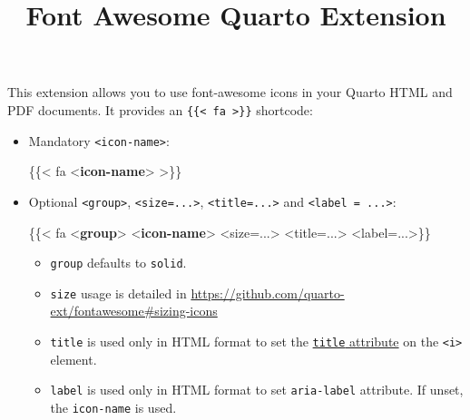 \documentclass[
  letterpaper,
  DIV=11,
  numbers=noendperiod]{scrartcl}
\title{Font Awesome Quarto Extension}
\author{}
\date{}
\newenvironment{Shaded}{\begin{snugshade}}{\end{snugshade}}
\newcommand{\DataTypeTok}[1]{\textcolor[rgb]{0.68,0.00,0.00}{#1}}
\newcommand{\KeywordTok}[1]{\textcolor[rgb]{0.00,0.23,0.31}{\textbf{#1}}}
\newcommand{\NormalTok}[1]{\textcolor[rgb]{0.00,0.23,0.31}{#1}}
\providecommand{\tightlist}{%
  \setlength{\itemsep}{0pt}\setlength{\parskip}{0pt}}
\begin{document}
\maketitle


This extension allows you to use font-awesome icons in your Quarto HTML
and PDF documents. It provides an
\texttt{\{\{\textless{}\ fa\ \textgreater{}\}\}} shortcode:

\begin{itemize}
\item
  Mandatory \texttt{\textless{}icon-name\textgreater{}}:

\begin{Shaded}
\begin{Highlighting}[]
\NormalTok{\{\{\textless{} fa }\DataTypeTok{\textless{}}\KeywordTok{icon{-}name}\DataTypeTok{\textgreater{}}\NormalTok{ \textgreater{}\}\}}
\end{Highlighting}
\end{Shaded}
\item
  Optional \texttt{\textless{}group\textgreater{}},
  \texttt{\textless{}size=...\textgreater{}},
  \texttt{\textless{}title=...\textgreater{}} and
  \texttt{\textless{}label\ =\ ...\textgreater{}}:

\begin{Shaded}
\begin{Highlighting}[]
\NormalTok{\{\{\textless{} fa }\DataTypeTok{\textless{}}\KeywordTok{group}\DataTypeTok{\textgreater{}} \DataTypeTok{\textless{}}\KeywordTok{icon{-}name}\DataTypeTok{\textgreater{}}\NormalTok{ \textless{}size=...\textgreater{} \textless{}title=...\textgreater{} \textless{}label=...\textgreater{}\}\}}
\end{Highlighting}
\end{Shaded}

  \begin{itemize}
  \tightlist
  \item
    \texttt{group} defaults to \texttt{solid}.
  \item
    \texttt{size} usage is detailed in
    \url{https://github.com/quarto-ext/fontawesome\#sizing-icons}
  \item
    \texttt{title} is used only in HTML format to set the
    \href{https://developer.mozilla.org/en-US/docs/Web/HTML/Reference/Global_attributes/title}{\texttt{title}
    attribute} on the \texttt{\textless{}i\textgreater{}} element.
  \item
    \texttt{label} is used only in HTML format to set
    \texttt{aria-label} attribute. If unset, the \texttt{icon-name} is
    used.
  \end{itemize}
\end{itemize}
\end{document}

